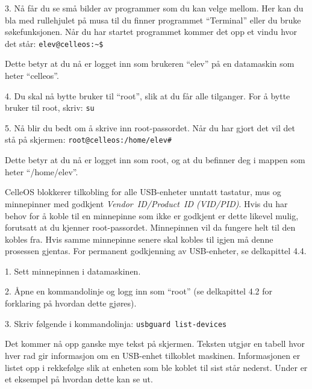\item{3.} N\aa{} f\aa r du se sm\aa{} bilder av programmer som du kan velge mellom. Her kan du bla med rullehjulet p\aa{} musa til du finner programmet ``Terminal'' eller du bruke s\o kefunksjonen. N\aa r du har startet programmet kommer det opp et vindu hvor det st\aa r:
\medskip
{\tt elev@celleos:\~{}\$}
\medskip
\item{} Dette betyr at du n\aa{} er logget inn som brukeren ``elev'' p\aa{} en datamaskin som heter ``celleos''.
\item{4.} Du skal n\aa{} bytte bruker til ``root'', slik at du f\aa r alle tilganger. For \aa{} bytte bruker til root, skriv:
\medskip
{\tt su}
\medskip
\item{5.} N\aa{} blir du bedt om \aa{} skrive inn root-passordet. N\aa r du har gjort det vil det st\aa{} p\aa{} skjermen:
\medskip
{\tt root@celleos:/home/elev\#}
\medskip
\item{} Dette betyr at du n\aa{} er logget inn som root, og at du befinner deg i mappen som heter ``/home/elev''.


CelleOS blokkerer tilkobling for alle USB-enheter unntatt tastatur, mus og minnepinner med godkjent {\it Vendor~ID/Product~ID (VID/PID)}. Hvis du har behov for \aa{} koble til en minnepinne som ikke er godkjent er dette likevel mulig, forutsatt at du kjenner root-passordet. Minnepinnen vil da fungere helt til den kobles fra. Hvis samme minnepinne senere skal kobles til igjen m\aa{} denne prosessen gjentas. For permanent godkjenning av USB-enheter, se delkapittel 4.4.
\item{1.} Sett minnepinnen i datamaskinen.
\item{2.} \AA pne en kommandolinje og logg inn som ``root'' (se delkapittel 4.2 for forklaring p\aa{} hvordan dette gj\o res).
\item{3.} Skriv f\o lgende i kommandolinja:
\medskip
{\tt usbguard list-devices}
\medskip
\item{} Det kommer n\aa{} opp ganske mye tekst p\aa{} skjermen. Teksten utgj\o r en tabell hvor hver rad gir informasjon om en USB-enhet tilkoblet maskinen. Informasjonen er listet opp i rekkef\o lge slik at enheten som ble koblet til sist st\aa r nederst. Under er et eksempel p\aa{} hvordan dette kan se ut.

\medskip
\centerline{\epsfxsize 8cm }
\medskip

